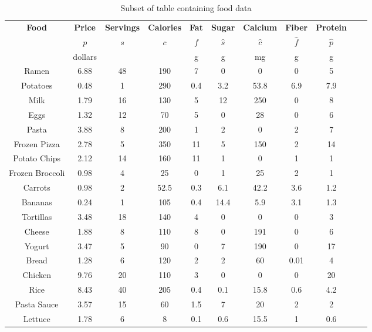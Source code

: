  \begin{table}[H]
\begin{tabular}{|c||c|c|c|c|c|c|c|c|c|c|}
\hline
\textbf{Food} & \textbf{Price} & \textbf{Servings} & \textbf{Calories} & \textbf{Fat} & \textbf{Sugar} & \textbf{Calcium} & \textbf{Fiber} & \textbf{Protein} \\ 
& $p$ & $s$ & $c$ & $f$ & $\hat{s}$ & $\hat{c}$ & $\hat{f}$ & $\hat{p}$ \\ 
& dollars & & & g & g & mg & g & g \\ \hline\hline
Ramen & 6.88 & 48 & 190 & 7 & 0 & 0 & 0 & 5 \\ \hline
Potatoes & 0.48 & 1 & 290 & 0.4 & 3.2 & 53.8 & 6.9 & 7.9 \\ \hline
Milk & 1.79 & 16 & 130 & 5 & 12 & 250 & 0 & 8 \\ \hline
Eggs & 1.32 & 12 & 70 & 5 & 0 & 28 & 0 & 6 \\ \hline
Pasta & 3.88 & 8 & 200 & 1 & 2 & 0 & 2 & 7 \\ \hline
Frozen Pizza & 2.78 & 5 & 350 & 11 & 5 & 150 & 2 & 14 \\ \hline
Potato Chips & 2.12 & 14 & 160 & 11 & 1 & 0 & 1 & 1 \\ \hline
Frozen Broccoli & 0.98 & 4 & 25 & 0 & 1 & 25 & 2 & 1 \\ \hline
Carrots & 0.98 & 2 & 52.5 & 0.3 & 6.1 & 42.2 & 3.6 & 1.2 \\ \hline
Bananas & 0.24 & 1 & 105 & 0.4 & 14.4 & 5.9 & 3.1 & 1.3 \\ \hline
Tortillas & 3.48 & 18 & 140 & 4 & 0 & 0 & 0 & 3 \\ \hline
Cheese & 1.88 & 8 & 110 & 8 & 0 & 191 & 0 & 6 \\ \hline
Yogurt & 3.47 & 5 & 90 & 0 & 7 & 190 & 0 & 17 \\ \hline
Bread & 1.28 & 6 & 120 & 2 & 2 & 60 & 0.01 & 4 \\ \hline
Chicken & 9.76 & 20 & 110 & 3 & 0 & 0 & 0 & 20 \\ \hline
Rice & 8.43 & 40 & 205 & 0.4 & 0.1 & 15.8 & 0.6 & 4.2 \\ \hline
Pasta Sauce & 3.57 & 15 & 60 & 1.5 & 7 & 20 & 2 & 2 \\ \hline
Lettuce & 1.78 & 6 & 8 & 0.1 & 0.6 & 15.5 & 1 & 0.6 \\ \hline
\end{tabular}
\caption{Subset of table containing food data}
\label{tab:food-data}
\end{table}

